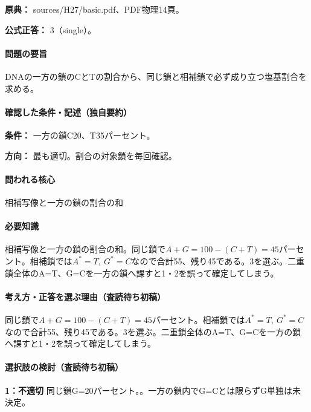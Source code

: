 \noindent\textbf{原典：} sources/H27/basic.pdf、PDF物理14頁。

\textbf{公式正答：} 3（single）。

\paragraph{問題の要旨} DNAの一方の鎖のCとTの割合から、同じ鎖と相補鎖で必ず成り立つ塩基割合を求める。

\paragraph{確認した条件・記述（独自要約）}\mbox{}\par

\noindent\textbf{条件：} 一方の鎖C20、T35パーセント。\par

\noindent\textbf{方向：} 最も適切。割合の対象鎖を毎回確認。\par

\paragraph{問われる核心} 相補写像と一方の鎖の割合の和

\paragraph{必要知識} 相補写像と一方の鎖の割合の和。同じ鎖で\(A+G=100-(C+T)=45\)パーセント。相補鎖では\(A^{\ast}=T,\ G^{\ast}=C\)なので合計55、残り45である。3を選ぶ。二重鎖全体のA=\allowbreak{}T、G=\allowbreak{}Cを一方の鎖へ課すと1・2を誤って確定してしまう。

\paragraph{考え方・正答を選ぶ理由（査読待ち初稿）} 同じ鎖で\(A+G=100-(C+T)=45\)パーセント。相補鎖では\(A^{\ast}=T,\ G^{\ast}=C\)なので合計55、残り45である。3を選ぶ。二重鎖全体のA=\allowbreak{}T、G=\allowbreak{}Cを一方の鎖へ課すと1・2を誤って確定してしまう。

\paragraph{選択肢の検討（査読待ち初稿）}\mbox{}\par

\noindent\textbf{1：不適切} 同じ鎖G=\allowbreak{}20パーセント。。一方の鎖内でG=\allowbreak{}Cとは限らずG単独は未決定。\par

